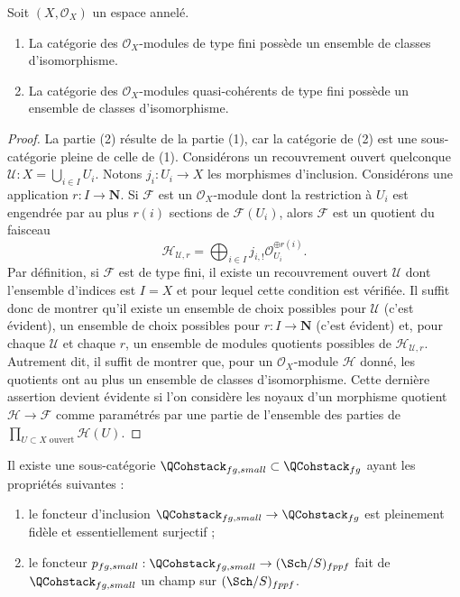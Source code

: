 \begin{lemma}
\label{lemma-finite-type}
Soit $(X, \mathcal{O}_X)$ un espace annelé.
\begin{enumerate}
\item La catégorie des $\mathcal{O}_X$-modules de type fini possède un
ensemble de classes d'isomorphisme.
\item La catégorie des $\mathcal{O}_X$-modules quasi-cohérents
de type fini possède un ensemble de classes d'isomorphisme.
\end{enumerate}
\end{lemma}

\begin{proof}
La partie (2) résulte de la partie (1), car la catégorie de (2) est une sous-catégorie
pleine de celle de (1). Considérons un recouvrement ouvert quelconque
$\mathcal{U} : X = \bigcup_{i \in I} U_i$. Notons $j_i : U_i \to X$
les morphismes d'inclusion. Considérons une application $r : I \to \mathbf{N}$.
Si $\mathcal{F}$ est un $\mathcal{O}_X$-module dont la restriction à
$U_i$ est engendrée par au plus $r(i)$ sections de $\mathcal{F}(U_i)$,
alors $\mathcal{F}$ est un quotient du faisceau
$$
\mathcal{H}_{\mathcal{U}, r} =
\bigoplus\nolimits_{i \in I} j_{i, !}\mathcal{O}_{U_i}^{\oplus r(i)}.
$$
Par définition, si $\mathcal{F}$ est de type fini, il existe
un recouvrement ouvert $\mathcal{U}$ dont l'ensemble d'indices est $I = X$
et pour lequel cette condition est vérifiée. Il suffit donc de montrer qu'il existe
un ensemble de choix possibles pour $\mathcal{U}$ (c'est évident),
un ensemble de choix possibles pour $r : I \to \mathbf{N}$ (c'est évident) et,
pour chaque $\mathcal{U}$ et chaque $r$, un ensemble de modules quotients possibles
de $\mathcal{H}_{\mathcal{U}, r}$. Autrement dit, il suffit de montrer
que, pour un $\mathcal{O}_X$-module $\mathcal{H}$ donné, les quotients ont
au plus un ensemble de classes d'isomorphisme.
Cette dernière assertion devient évidente
si l'on considère les noyaux d'un morphisme quotient
$\mathcal{H} \to \mathcal{F}$
comme paramétrés par une partie de l'ensemble des parties de
$\prod_{U \subset X\text{ ouvert}} \mathcal{H}(U)$.
\end{proof}

\begin{lemma}
\label{lemma-stack-fg-quasi-coherent}
Il existe une sous-catégorie
$\QCohstack_{fg, small} \subset \QCohstack_{fg}$
ayant les propriétés suivantes :
\begin{enumerate}
\item le foncteur d'inclusion
$\QCohstack_{fg, small} \to \QCohstack_{fg}$ est
pleinement fidèle et essentiellement surjectif ;
\item le foncteur
$p_{fg, small} : \QCohstack_{fg, small} \to (\Sch/S)_{fppf}$
fait de $\QCohstack_{fg, small}$ un champ sur $(\Sch/S)_{fppf}$.
\end{enumerate}
\end{lemma}

